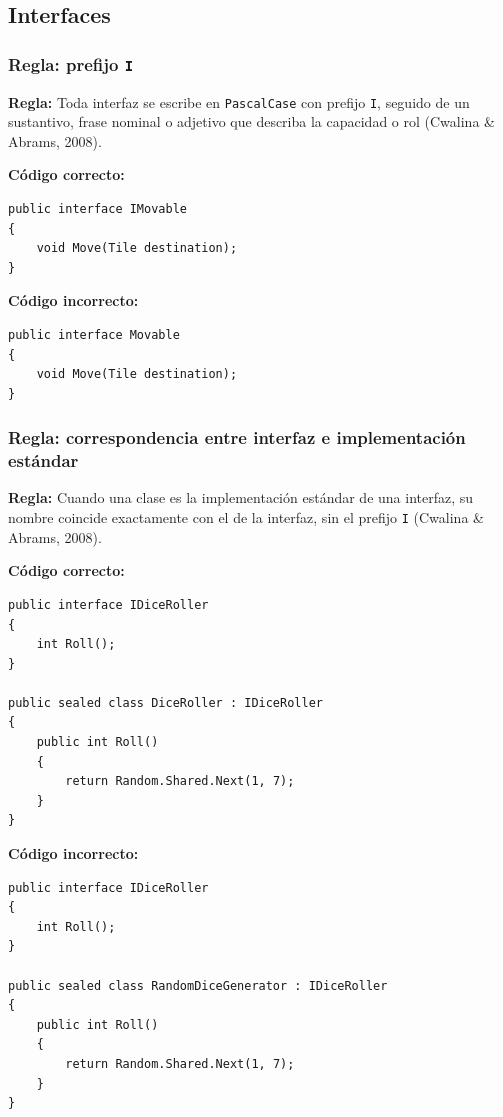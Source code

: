 \subsection{Interfaces}

\subsubsection{Regla: prefijo \texttt{I}}

\textbf{Regla:} Toda interfaz se escribe en \texttt{PascalCase} con prefijo \texttt{I}, seguido de un sustantivo, frase nominal o adjetivo que describa la capacidad o rol (Cwalina \& Abrams, 2008).

\textbf{Código correcto:}
\begin{lstlisting}[style=csharpstyle]
public interface IMovable
{
    void Move(Tile destination);
}
\end{lstlisting}

\textbf{Código incorrecto:}
\begin{lstlisting}[style=csharpstyle]
public interface Movable
{
    void Move(Tile destination);
}
\end{lstlisting}

\subsubsection{Regla: correspondencia entre interfaz e implementación estándar}

\textbf{Regla:} Cuando una clase es la implementación estándar de una interfaz, su nombre coincide exactamente con el de la interfaz, sin el prefijo \texttt{I} (Cwalina \& Abrams, 2008).

\textbf{Código correcto:}
\begin{lstlisting}[style=csharpstyle]
public interface IDiceRoller
{
    int Roll();
}

public sealed class DiceRoller : IDiceRoller
{
    public int Roll()
    {
        return Random.Shared.Next(1, 7);
    }
}
\end{lstlisting}

\textbf{Código incorrecto:}
\begin{lstlisting}[style=csharpstyle]
public interface IDiceRoller
{
    int Roll();
}

public sealed class RandomDiceGenerator : IDiceRoller
{
    public int Roll()
    {
        return Random.Shared.Next(1, 7);
    }
}
\end{lstlisting}

